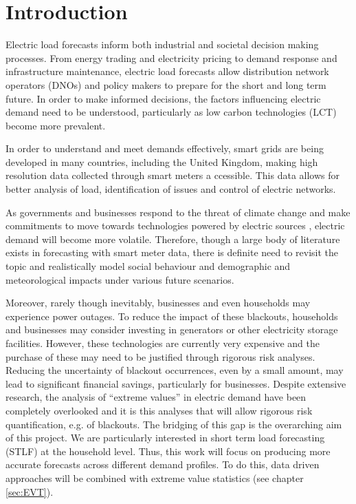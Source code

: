 
\chapter{Introduction}

Electric load forecasts inform both industrial and societal decision making processes. From energy trading and electricity pricing to demand response and infrastructure maintenance,  electric load forecasts allow distribution network operators (DNOs) and policy makers to prepare for the short and long term future. In order to make informed decisions, the factors influencing electric demand need to be understood, particularly as low carbon technologies (LCT) become more prevalent. 

In order to understand and meet demands effectively, smart grids are being developed in many countries, including the United Kingdom, making high resolution data collected through smart meters a ccessible. This data allows for better analysis of load, identification of issues and control of electric networks. 

As governments and businesses respond to the threat of climate change and make commitments to move towards technologies powered by electric sources \citep{fuelban}, electric demand will become more volatile. Therefore, though a large body of literature exists in forecasting with smart meter data, there is definite need to revisit the topic and realistically model social behaviour and demographic and meteorological impacts under various future scenarios.

Moreover, rarely though inevitably, businesses and even households may experience power outages. To reduce the impact of these blackouts, households and businesses may consider investing in generators or other electricity storage facilities. However, these technologies are currently very expensive and the purchase of these may need to be justified through rigorous risk analyses. Reducing the uncertainty of blackout occurrences, even by a small amount, may lead to significant financial savings, particularly for businesses. Despite extensive research, the analysis of ``extreme values'' in electric demand have been completely overlooked and it is this analyses that will allow rigorous risk quantification, e.g. of blackouts. The bridging of this gap is the overarching aim of this project. We are particularly interested in short term load forecasting (STLF) at the household level. Thus, this work will focus on producing more accurate forecasts across different demand profiles. To do this, data driven approaches will be combined with extreme value statistics (see chapter \ref{sec:EVT}).

